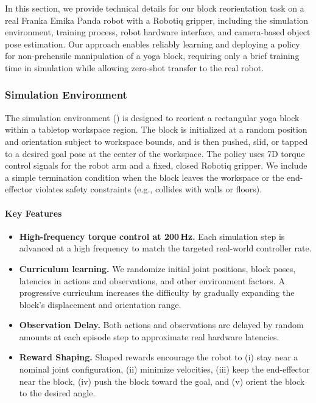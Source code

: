 In this section, we provide technical details for our block reorientation task on a real Franka Emika Panda robot with a Robotiq gripper, including the simulation environment, training process, robot hardware interface, and camera-based object pose estimation. Our approach enables reliably learning and deploying a policy for non-prehensile manipulation of a yoga block, requiring only a brief training time in simulation while allowing zero-shot transfer to the real robot.  

\subsubsection{Simulation Environment}
\label{appendix:RealWorldNonprehensileReorientationPolicyPerformance:sim-env}


The simulation environment () is designed to reorient a rectangular yoga block within a tabletop workspace region. The block is initialized at a random position and orientation subject to workspace bounds, and is then pushed, slid, or tapped to a desired goal pose at the center of the workspace. The policy uses 7D torque control signals for the robot arm and a fixed, closed Robotiq gripper. We include a simple termination condition when the block leaves the workspace or the end-effector violates safety constraints (e.g., collides with walls or floors).

\paragraph{Key Features}
\begin{itemize}[leftmargin=1em]
    \item \textbf{High-frequency torque control at 200\,Hz.} Each simulation step is advanced at a high frequency to match the targeted real-world controller rate.  
    \item \textbf{Curriculum learning.} We randomize initial joint positions, block poses, latencies in actions and observations, and other environment factors. A progressive curriculum increases the difficulty by gradually expanding the block's displacement and orientation range.  
    \item \textbf{Observation Delay.} Both actions and observations are delayed by random amounts at each episode step to approximate real hardware latencies.
    \item \textbf{Reward Shaping.} Shaped rewards encourage the robot to (i) stay near a nominal joint configuration, (ii) minimize velocities, (iii) keep the end-effector near the block, (iv) push the block toward the goal, and (v) orient the block to the desired angle.  
\end{itemize}

